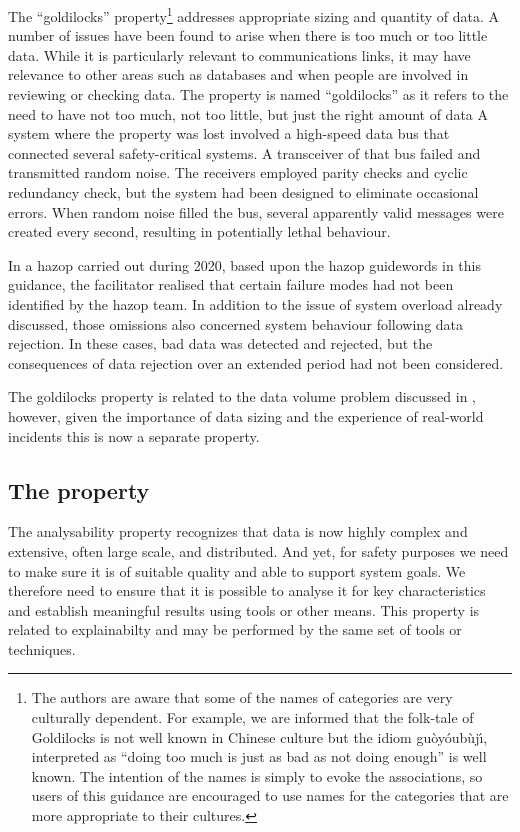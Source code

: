 The ``\Gls{goldilocks}'' property\footnote{The authors are aware that some of the names of categories are very culturally dependent. For example, we are informed that the folk-tale of Goldilocks is not well known in Chinese culture but the idiom gu\`oy\'oub\`uj\'\i, interpreted as ``doing too much is just as bad as not doing enough'' is well known. The intention of the names is simply to evoke the associations, so users of this guidance are encouraged to use names for the categories that are more appropriate to their cultures.} addresses appropriate sizing and quantity of data. A number of issues have been found to arise when there is too much or too little data. While it is particularly relevant to communications links, it may have relevance to other areas such as \glspl{database} and when people are involved in reviewing or checking data. The property is named ``\gls{goldilocks}'' as it refers to the need to have not too much, not too little, but just the right amount of data%
%
A system where the property was lost involved a high-speed data bus that connected several safety-critical systems. A transceiver of that bus failed and transmitted random noise. The receivers employed parity checks and cyclic redundancy check, but the system had been designed to eliminate occasional \glspl{error}. When random noise filled the bus, several apparently valid messages were created every second, resulting in potentially lethal behaviour.
	
	In a \gls{hazop} carried out during 2020, based upon the \gls{hazop} guidewords in this guidance, the facilitator realised that certain failure modes had not been identified by the \gls{hazop} team. In addition to the issue of system overload already discussed, those omissions also concerned system behaviour following data rejection. In these cases, bad data was detected and rejected, but the consequences of data rejection over an extended period had not been considered.

The \gls{goldilocks} property is related to the data volume problem discussed in , however, given the importance of data sizing and the experience of real-world incidents this is now a separate property.
%
\subsection{The  property}\label{bkm:guidance:analysability}
The \gls{analysability} property recognizes that data is now highly complex and extensive, often large scale, and distributed. And yet, for safety purposes we need to make sure it is of suitable quality and able to support system goals.
We therefore need to ensure that it is possible to analyse it for key characteristics and establish meaningful results using tools or other means. This property is related to explainabilty and may be performed by the same set of tools or techniques.

